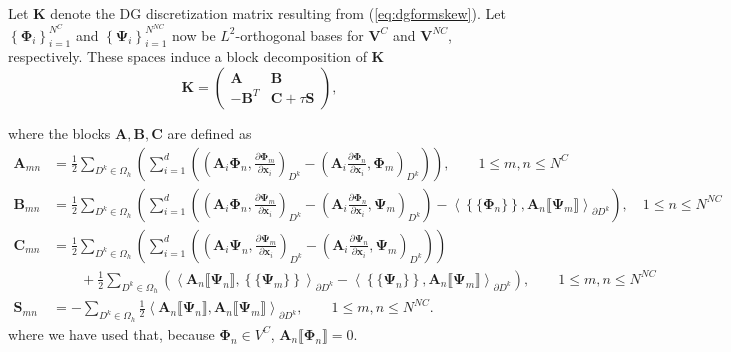 \documentclass[preprint,10pt]{elsarticle}
\newcommand{\pd}[2]{\frac{\partial#1}{\partial#2}}
\newcommand{\LRp}[1]{\left( #1 \right)}
\newcommand{\LRa}[1]{\left\langle #1 \right\rangle}
\newcommand{\LRc}[1]{\left\{ #1 \right\}}
\newcommand{\jump}[1] {\ensuremath{\llbracket#1\rrbracket}}
\newcommand{\avg}[1] {\ensuremath{\LRc{\!\{#1\}\!}}}
\newcommand{\Oh}{\Omega_h}
\newcommand{\note}[1]{#1}
\begin{document}
Let $\bm{K}$ denote the DG discretization matrix resulting from (\ref{eq:dgformskew}).  Let $\LRc{\bm{\Phi}_i }_{i=1}^{N^{C}}$ and $\LRc{\bm{\Psi}_i }_{i=1}^{N^{NC}}$ now be $L^2$-orthogonal bases for $\bm{V}^C$ and $\bm{V}^{NC}$, respectively.  These spaces induce a block decomposition of $\bm{K}$
\begin{equation}
\bm{K} = \left(\begin{array}{cc}
\bm{A} & \bm{B}\\
-{\bm{B}}^T & \bm{C} + \tau \bm{S}
\end{array}\right),
\label{eq:block}
\end{equation}
\note{
where the blocks $\bm{A},\bm{B},\bm{C}$ are defined as
\begin{align*}
\bm{A}_{mn} &= \frac{1}{2}\sum_{D^k\in \Oh} \LRp{ \sum_{i=1}^d\LRp{\LRp{\bm{A}_i\bm{\Phi}_n, \pd{\bm{\Phi}_m}{\bm{x}_i}}_{D^k} - \LRp{\bm{A}_i \pd{\bm{\Phi}_n}{\bm{x}_i}, {\bm{\Phi}_m}}_{D^k}}}, \qquad 1\leq m,n \leq N^C\\
\bm{B}_{mn} &= \frac{1}{2}\sum_{D^k\in \Oh} \LRp{ \sum_{i=1}^d\LRp{\LRp{\bm{A}_i\bm{\Phi}_n, \pd{\bm{\Psi}_m}{\bm{x}_i}}_{D^k} - \LRp{\bm{A}_i \pd{\bm{\Phi}_n}{\bm{x}_i}, {\bm{\Psi}_m}}_{D^k}} - {\LRa{\avg{\bm{\Phi}_n}, \bm{A}_n\jump{\bm{\Psi}_m}}_{\partial D^k}} }, \quad 1\leq n \leq N^{NC} \\
\bm{C}_{mn}  &=  \frac{1}{2}\sum_{D^k\in \Oh}\LRp{
\sum_{i=1}^d\LRp{\LRp{\bm{A}_i\bm{\Psi}_n, \pd{\bm{\Psi}_m}{\bm{x}_i}}_{D^k} - \LRp{\bm{A}_i \pd{\bm{\Psi}_n}{\bm{x}_i}, {\bm{\Psi}_m}}_{D^k}}}\\
&\qquad + \frac{1}{2}\sum_{D^k\in \Oh}\LRp{\LRa{\bm{A}_n\jump{\bm{\Psi}_n}, \avg{\bm{\Psi}_m}}_{\partial D^k}-\LRa{\avg{\bm{\Psi}_n}, \bm{A}_n\jump{\bm{\Psi}_m}}_{\partial D^k}}, \qquad 1 \leq m,n \leq N^{NC}\\
\bm{S}_{mn}  &= -\sum_{D^k\in \Oh}  \frac{1}{2}\LRa{\bm{A}_n\jump{\bm{\Psi}_n},\bm{A}_n\jump{\bm{\Psi}_m}}_{\partial D^k}, \qquad 1 \leq m,n \leq N^{NC}.  
\end{align*}
where we have used that, because $\bm{\Phi}_n\in V^{C}$, $\bm{A}_n\jump{\bm{\Phi}_n} = 0$.}
\end{document}

